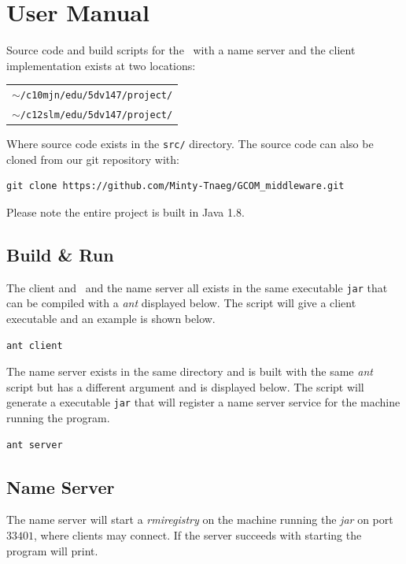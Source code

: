 \section{User Manual}
Source code and build scripts for the \mw\ with a name server and the client implementation exists at two locations:

\begin{tabular}{l}
	$\sim$\texttt{/c10mjn/edu/5dv147/project/}\\
	$\sim$\texttt{/c12slm/edu/5dv147/project/}\\
\end{tabular}

Where source code exists in the \texttt{src/} directory. The source code can also be cloned from our git repository with:

\begin{verbatim}
git clone https://github.com/Minty-Tnaeg/GCOM_middleware.git
\end{verbatim}

Please note the entire project is built in Java 1.8.

\subsection{Build \& Run}
The client and \mw\ and the name server all exists in the same executable \texttt{jar} that can be compiled with a \textit{ant} displayed below. The script will give a client executable and an example is shown below.

\begin{verbatim}
ant client
\end{verbatim}

The name server exists in the same directory and is built with the same \textit{ant} script but has a different argument and is displayed below. The script will generate a executable \texttt{jar} that will register a name server service for the machine running the program. 

\begin{verbatim}
ant server
\end{verbatim}

\subsection{Name Server}
The name server will start a \textit{rmiregistry} on the machine running the \textit{jar} on port $33401$, where clients may connect. If the server succeeds with starting the program will print.

